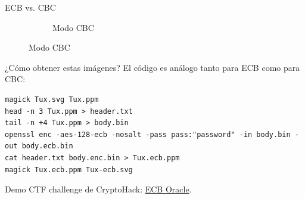 \begin{frame}{ECB vs. CBC}
\begin{figure}[h!]
\begin{subfigure}[b]{0.3\textwidth}
      \caption{Modo CBC}
    \end{subfigure}
  \end{figure}

  \begin{alertblock}{¿Cómo obtener estas imágenes?}
    El código es análogo tanto para ECB como para CBC:
    \begin{verbatim}
magick Tux.svg Tux.ppm 
head -n 3 Tux.ppm > header.txt 
tail -n +4 Tux.ppm > body.bin 
openssl enc -aes-128-ecb -nosalt -pass pass:"password" -in body.bin -out body.ecb.bin 
cat header.txt body.enc.bin > Tux.ecb.ppm 
magick Tux.ecb.ppm Tux-ecb.svg
    \end{verbatim}
  \end{alertblock}

  \begin{example}{Demo}
    CTF challenge de CryptoHack: \href{https://aes.cryptohack.org/ecb_oracle/}{ECB Oracle}.
  \end{example}
\end{frame}

